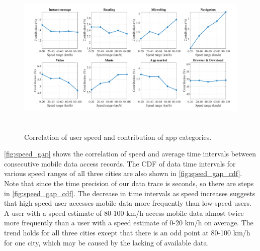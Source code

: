 \begin{figure}
    \centering
    \includegraphics[width=\linewidth,height=3in]{./figures/large_font/speed_appcat.pdf}
    \vspace{-0.3in}
    \caption{Correlation of user speed and contribution of app categories.}
    \label{fig:speed_appcat}
\end{figure}

\autoref{fig:speed_gap} shows the correlation of speed and average time intervals between consecutive mobile data access records. The CDF of data time intervals for various speed ranges of all three cities are also shown in \autoref{fig:speed_gap_cdf}. Note that since the time precision of our data trace is seconds, so there are steps in \autoref{fig:speed_gap_cdf}. The decrease in time intervals as speed increases suggests that high-speed user accesses mobile data more frequently than low-speed users. A user with a speed estimate of 80-100 km/h access mobile data almost twice more frequently than a user with a speed estimate of 0-20 km/h on average. The trend holds for all three cities except that there is an odd point at 80-100 km/h for one city, which may be caused by the lacking of available data.


